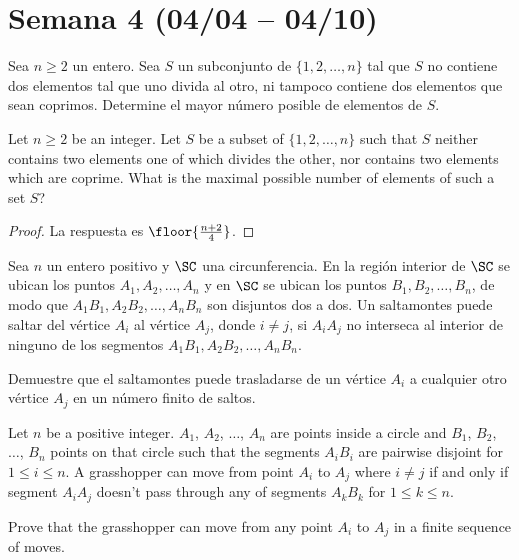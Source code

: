 \section{Semana 4 (04/04 -- 04/10)}


\begin{probMR}[Balkan MO 2005/4]
  Sea $n\ge 2$ un entero. Sea $S$ un subconjunto de $\{1,2,\dots,n\}$ tal que
  $S$ no contiene dos elementos tal que uno divida al otro, ni tampoco contiene
  dos elementos que sean coprimos. Determine el mayor número posible de
  elementos de $S$.
  \begin{hint}
    Let $n\ge 2$ be an integer. Let $S$ be a subset of $\{1,2,\dots,n\}$ such
    that $S$ neither contains two elements one of which divides the other, nor
    contains two elements which are coprime. What is the maximal possible number
    of elements of such a set $S$?
  \end{hint}
\end{probMR}

\begin{proof}
  La respuesta es $\floor{\frac{n+2}{4}}$.
\end{proof}

\begin{probMB}[Croatian MO 2018/5]
  Sea $n$ un entero positivo y $\SC$ una circunferencia. En la región interior
  de $\SC$ se ubican los puntos $A_1,A_2,\dots,A_n$ y en $\SC$ se ubican los
  puntos $B_1,B_2,\dots,B_n$, de modo que $A_1B_1,A_2B_2,\dots,A_nB_n$ son
  disjuntos dos a dos. Un saltamontes puede saltar del vértice $A_i$ al vértice
  $A_j$, donde $i\ne j$, si $A_iA_j$ no interseca al interior de ninguno de los
  segmentos $A_1B_1,A_2B_2,\dots,A_nB_n$.

  Demuestre que el saltamontes puede trasladarse de un vértice $A_i$ a cualquier
  otro vértice $A_j$ en un número finito de saltos.
  \begin{hint}
    Let $n$ be a positive integer. $A_1$, $A_2$, $\dots$, $A_n$ are points
    inside a circle and $B_1$, $B_2$, $\dots$, $B_n$ points on that circle such
    that the segments $A_iB_i$ are pairwise disjoint for $1\le i\le n$. A
    grasshopper can move from point $A_i$ to $A_j$ where $i\ne j$ if and only if
    segment $A_iA_j$ doesn't pass through any of segments $A_kB_k$ for
    $1\le k\le n$.

    Prove that the grasshopper can move from any point $A_i$ to $A_j$ in a
    finite sequence of moves.
  \end{hint}
\end{probMB}

